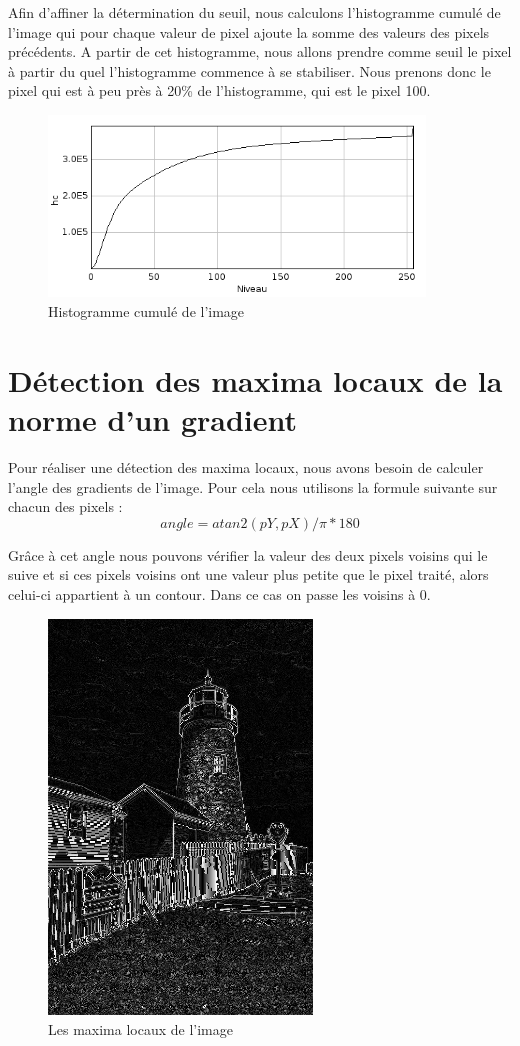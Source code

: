 \documentclass[a4paper,11pt]{article}
\begin{document}
  Afin d'affiner la détermination du seuil, nous calculons l'histogramme cumulé de l'image qui pour chaque valeur 
  de pixel ajoute la somme des valeurs des pixels précédents. A partir de cet histogramme, nous allons prendre comme 
  seuil le pixel à partir du quel l'histogramme commence à se stabiliser. Nous prenons donc le pixel qui est à peu près 
  à 20\% de l'histogramme, qui est le pixel 100.\\
  
  \begin{figure}[H]
  \center
   \includegraphics[width=10cm]{../histoCumul.png}
   \caption{Histogramme cumulé de l'image}
  \end{figure}
  
  \section{Détection des maxima locaux de la norme d'un gradient}
  Pour réaliser une détection des maxima locaux, nous avons besoin de calculer l'angle des gradients
  de l'image. Pour cela nous utilisons la formule suivante sur chacun des pixels :
  $$angle = atan2(pY, pX)/\pi*180$$
  
  Grâce à cet angle nous pouvons vérifier la valeur des deux pixels voisins qui le suive et si ces pixels
  voisins ont une valeur plus petite que le pixel traité, alors celui-ci appartient à un contour.
  Dans ce cas on passe les voisins à 0.\\
  
  \begin{figure}[H]
  \center
   \includegraphics[width=7cm]{../maxima_locaux.png}
   \caption{Les maxima locaux de l'image}
  \end{figure}
  
\end{document}
